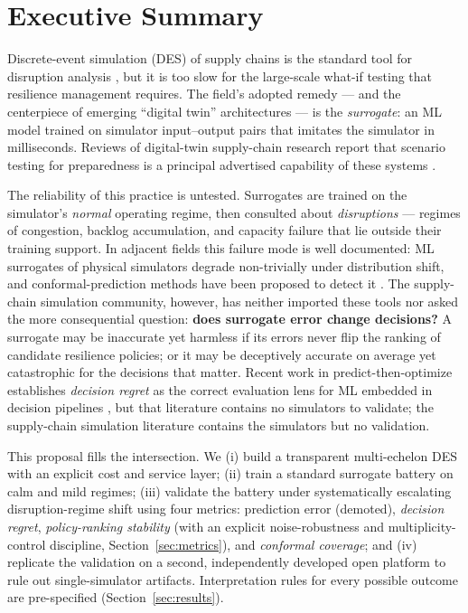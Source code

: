 \documentclass[12pt,a4paper]{article}
\begin{document}
\section{Executive Summary}

Discrete-event simulation (DES) of supply chains is the standard tool for disruption analysis \citep{law2015,kleijnen2015}, but it is too slow for the large-scale what-if testing that resilience management requires. The field's adopted remedy --- and the centerpiece of emerging ``digital twin'' architectures --- is the \emph{surrogate}: an ML model trained on simulator input--output pairs that imitates the simulator in milliseconds. Reviews of digital-twin supply-chain research report that scenario testing for preparedness is a principal advertised capability of these systems \citep{liu2026,tolia2026,meliani2026}.

The reliability of this practice is untested. Surrogates are trained on the simulator's \emph{normal} operating regime, then consulted about \emph{disruptions} --- regimes of congestion, backlog accumulation, and capacity failure that lie outside their training support. In adjacent fields this failure mode is well documented: ML surrogates of physical simulators degrade non-trivially under distribution shift, and conformal-prediction methods have been proposed to detect it \citep{gopakumar2026,zimmel2026}. The supply-chain simulation community, however, has neither imported these tools nor asked the more consequential question: \textbf{does surrogate error change decisions?} A surrogate may be inaccurate yet harmless if its errors never flip the ranking of candidate resilience policies; or it may be deceptively accurate on average yet catastrophic for the decisions that matter. Recent work in predict-then-optimize establishes \emph{decision regret} as the correct evaluation lens for ML embedded in decision pipelines \citep{elmachtoub2022,ban2019,misic2020}, but that literature contains no simulators to validate; the supply-chain simulation literature contains the simulators but no validation.

This proposal fills the intersection. We (i) build a transparent multi-echelon DES with an explicit cost and service layer; (ii) train a standard surrogate battery on calm and mild regimes; (iii) validate the battery under systematically escalating disruption-regime shift using four metrics: prediction error (demoted), \emph{decision regret}, \emph{policy-ranking stability} (with an explicit noise-robustness and multiplicity-control discipline, Section~\ref{sec:metrics}), and \emph{conformal coverage}; and (iv) replicate the validation on a second, independently developed open platform \citep{zhang2026isomorph} to rule out single-simulator artifacts. Interpretation rules for every possible outcome are pre-specified (Section~\ref{sec:results}).
\end{document}
